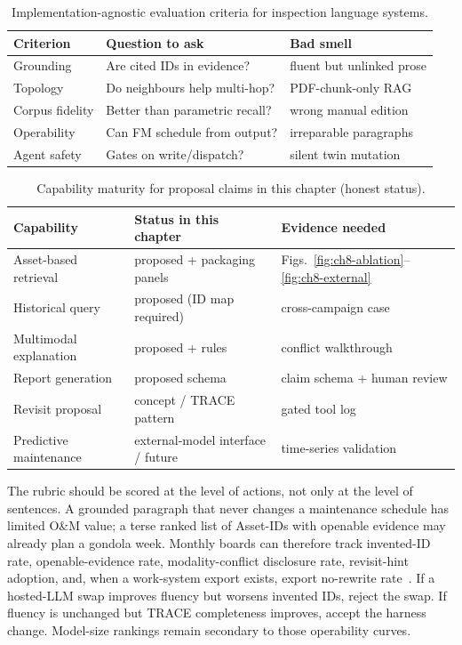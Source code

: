 \begin{table}[htbp]
\centering
\caption{Implementation-agnostic evaluation criteria for inspection language systems.}
\label{tab:ch8-eval}
\begin{tabular}{llp{4.8cm}}
\toprule
Criterion & Question to ask & Bad smell \\
\midrule
Grounding & Are cited IDs in evidence? & fluent but unlinked prose \\
Topology & Do neighbours help multi-hop? & PDF-chunk-only RAG \\
Corpus fidelity & Better than parametric recall? & wrong manual edition \\
Operability & Can FM schedule from output? & irreparable paragraphs \\
Agent safety & Gates on write/dispatch? & silent twin mutation \\
\bottomrule
\end{tabular}
\end{table}

\begin{table}[htbp]
\centering
\caption{Capability maturity for proposal claims in this chapter (honest status).}
\label{tab:ch8-cap-maturity}
\begin{tabular}{llp{4.2cm}}
\toprule
Capability & Status in this chapter & Evidence needed \\
\midrule
Asset-based retrieval & proposed + packaging panels & Figs.~\ref{fig:ch8-ablation}--\ref{fig:ch8-external} \\
Historical query & proposed (ID map required) & cross-campaign case \\
Multimodal explanation & proposed + rules & conflict walkthrough \\
Report generation & proposed schema & claim schema + human review \\
Revisit proposal & concept / TRACE pattern & gated tool log \\
Predictive maintenance & external-model interface / future & time-series validation \\
\bottomrule
\end{tabular}
\end{table}

The rubric should be scored at the level of actions, not only at the level of sentences. A grounded paragraph that never changes a maintenance schedule has limited O\&M value; a terse ranked list of Asset-IDs with openable evidence may already plan a gondola week. Monthly boards can therefore track invented-ID rate, openable-evidence rate, modality-conflict disclosure rate, revisit-hint adoption, and, when a work-system export exists, export no-rewrite rate~\cite{lee2024ragsafety,luo2025llmdtrobot,rawat2025llmmas,liang2023helm}. If a hosted-LLM swap improves fluency but worsens invented IDs, reject the swap. If fluency is unchanged but TRACE completeness improves, accept the harness change. Model-size rankings remain secondary to those operability curves.

